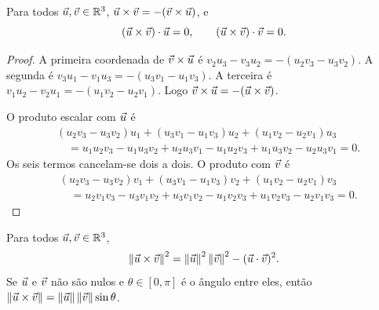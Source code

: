 \documentclass[11pt,a4paper]{article}
\begin{document}
\begin{proposicao}\label{prop:vetorial}
Para todos $\vec{u},\vec{v}\in\mathbb{R}^3$, $\vec{u}\times\vec{v}=-(\vec{v}\times\vec{u})$, e
\[
(\vec{u}\times\vec{v})\cdot\vec{u}=0,\qquad (\vec{u}\times\vec{v})\cdot\vec{v}=0.
\]
\end{proposicao}

\begin{proof}
A primeira coordenada de $\vec{v}\times\vec{u}$ é $v_2u_3-v_3u_2=-(u_2v_3-u_3v_2)$. A segunda é $v_3u_1-v_1u_3=-(u_3v_1-u_1v_3)$. A terceira é $v_1u_2-v_2u_1=-(u_1v_2-u_2v_1)$. Logo $\vec{v}\times\vec{u}=-(\vec{u}\times\vec{v})$.

O produto escalar com $\vec{u}$ é
\begin{align*}
&(u_2v_3-u_3v_2)u_1+(u_3v_1-u_1v_3)u_2+(u_1v_2-u_2v_1)u_3\\
&\quad=u_1u_2v_3-u_1u_3v_2+u_2u_3v_1-u_1u_2v_3+u_1u_3v_2-u_2u_3v_1
=0.
\end{align*}
Os seis termos cancelam-se dois a dois. O produto com $\vec{v}$ é
\begin{align*}
&(u_2v_3-u_3v_2)v_1+(u_3v_1-u_1v_3)v_2+(u_1v_2-u_2v_1)v_3\\
&\quad=u_2v_1v_3-u_3v_1v_2+u_3v_1v_2-u_1v_2v_3+u_1v_2v_3-u_2v_1v_3
=0.
\end{align*}
\end{proof}

\begin{teorema}\label{teo:lagrange}
Para todos $\vec{u},\vec{v}\in\mathbb{R}^3$,
\[
\left\lVert \vec{u}\times\vec{v} \right\rVert^2=\left\lVert \vec{u} \right\rVert^2\left\lVert \vec{v} \right\rVert^2-(\vec{u}\cdot\vec{v})^2.
\]
Se $\vec{u}$ e $\vec{v}$ não são nulos e $\theta\in[0,\pi]$ é o ângulo entre eles, então $\left\lVert \vec{u}\times\vec{v} \right\rVert=\left\lVert \vec{u} \right\rVert\left\lVert \vec{v} \right\rVert\sin\theta$.
\end{teorema}
\end{document}
